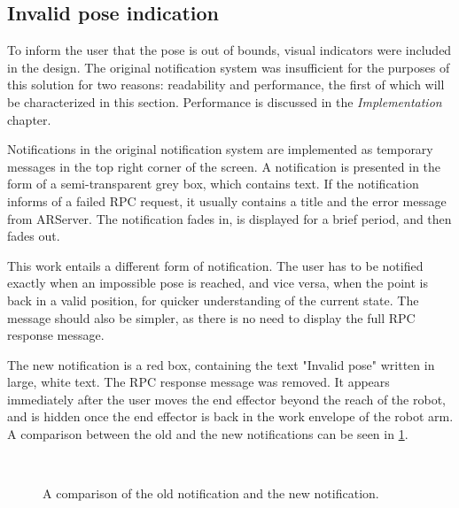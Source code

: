 \subsection{Invalid pose indication} 

To inform the user that the pose is out of bounds, visual indicators were included in the design. The original notification system was insufficient for the purposes of this solution for two reasons: readability and performance, the first of which will be characterized in this section. Performance is discussed in the \textit{Implementation} chapter.

Notifications in the original notification system are implemented as temporary messages in the top right corner of the screen. A notification is presented in the form of a semi-transparent grey box, which contains text. If the notification informs of a failed RPC request, it usually contains a title and the error message from ARServer. The notification fades in, is displayed for a brief period, and then fades out. 

This work entails a different form of notification. The user has to be notified exactly when an impossible pose is reached, and vice versa, when the point is back in a valid position, for quicker understanding of the current state. The message should also be simpler, as there is no need to display the full RPC response message.

The new notification is a red box, containing the text "Invalid pose" written in large, white text. The RPC response message was removed. It appears immediately after the user moves the end effector beyond the reach of the robot, and is hidden once the end effector is back in the work envelope of the robot arm. A comparison between the old and the new notifications can be seen in \ref{fig:notifications}.

\begin{figure}[h]
    \centering
    \\
    
    \caption{A comparison of the old notification and the new notification.}
    \label{fig:notifications}
\end{figure}

